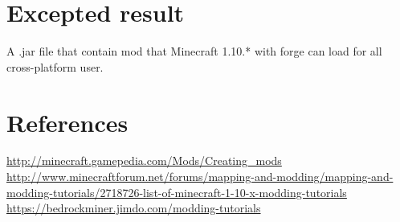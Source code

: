 \documentclass[12pt]{article}
\newcommand\tab[1][1cm]{\hspace*{#1}}
\begin{document}
\begin{CJK}{UTF8}{bkai}
	\section{Excepted result}
	\tab A .jar file that contain mod that Minecraft 1.10.* with forge can load for all cross-platform user.
	\newpage
	\section*{References}
	\url{http://minecraft.gamepedia.com/Mods/Creating_mods}\\
	\url{http://www.minecraftforum.net/forums/mapping-and-modding/mapping-and-modding-tutorials/2718726-list-of-minecraft-1-10-x-modding-tutorials}\\
	\url{https://bedrockminer.jimdo.com/modding-tutorials}\\
	\end{CJK}
\end{document}
